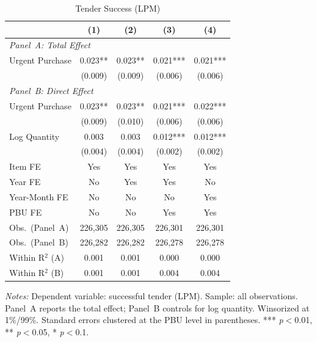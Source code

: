 \begin{table}[ht]
  \centering
  \caption{Tender Success (LPM)}
  \label{tab:success}
  \small
  \begin{threeparttable}
  \begin{tabular}{lcccc}
    \hline\hline
    & (1) & (2) & (3) & (4) \\
    \hline
    \multicolumn{5}{l}{\textit{Panel~A: Total Effect}} \\[3pt]
    Urgent Purchase & 0.023** & 0.023** & 0.021*** & 0.021*** \\
     & (0.009) & (0.009) & (0.006) & (0.006) \\[3pt]
    \hline
    \multicolumn{5}{l}{\textit{Panel~B: Direct Effect}} \\[3pt]
    Urgent Purchase & 0.023** & 0.023** & 0.021*** & 0.022*** \\
     & (0.009) & (0.010) & (0.006) & (0.006) \\[3pt]
    Log Quantity & 0.003 & 0.003 & 0.012*** & 0.012*** \\
     & (0.004) & (0.004) & (0.002) & (0.002) \\[3pt]
    \hline
    Item FE & Yes & Yes & Yes & Yes \\
    Year FE & No & Yes & Yes & No \\
    Year-Month FE & No & No & No & Yes \\
    PBU FE & No & No & Yes & Yes \\
    Obs.\ (Panel~A) & 226,305 & 226,305 & 226,301 & 226,301 \\
    Obs.\ (Panel~B) & 226,282 & 226,282 & 226,278 & 226,278 \\
    Within R$^2$ (A) & 0.001 & 0.001 & 0.000 & 0.000 \\
    Within R$^2$ (B) & 0.001 & 0.001 & 0.004 & 0.004 \\
    \hline\hline
  \end{tabular}
  \begin{tablenotes}
    \small
    \item \textit{Notes:} Dependent variable: successful tender (LPM). Sample: all observations. Panel~A reports the total effect; Panel~B controls for log quantity. Winsorized at 1\%/99\%. Standard errors clustered at the PBU level in parentheses. *** \textit{p}$<$0.01, ** \textit{p}$<$0.05, * \textit{p}$<$0.1.
  \end{tablenotes}
  \end{threeparttable}
\end{table}
